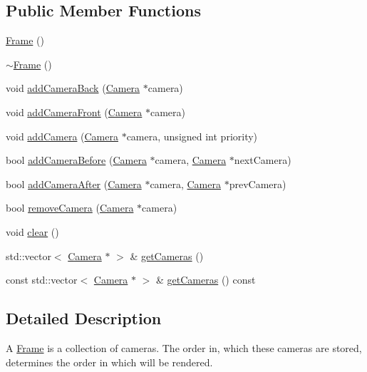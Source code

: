 \subsection*{Public Member Functions}
\begin{DoxyCompactItemize}
\item 
\mbox{\hyperlink{classec_1_1_frame_a80ed1da85818f646b6b80fb6c8a6c2a6}{Frame}} ()
\item 
\mbox{\hyperlink{classec_1_1_frame_af2b2c733cacb47d99e460a2b75667eaa}{$\sim$\+Frame}} ()
\item 
void \mbox{\hyperlink{classec_1_1_frame_a1cfcb26e088e6f6b07103af8ac9d3bfa}{add\+Camera\+Back}} (\mbox{\hyperlink{classec_1_1_camera}{Camera}} $\ast$camera)
\item 
void \mbox{\hyperlink{classec_1_1_frame_abcbaa8a587c8ad75173aacaa853bc5b2}{add\+Camera\+Front}} (\mbox{\hyperlink{classec_1_1_camera}{Camera}} $\ast$camera)
\item 
void \mbox{\hyperlink{classec_1_1_frame_a04ba39407bc0f6e78fe47f37b3f19131}{add\+Camera}} (\mbox{\hyperlink{classec_1_1_camera}{Camera}} $\ast$camera, unsigned int priority)
\item 
bool \mbox{\hyperlink{classec_1_1_frame_af1f1769a61f70a756fd762d80a676063}{add\+Camera\+Before}} (\mbox{\hyperlink{classec_1_1_camera}{Camera}} $\ast$camera, \mbox{\hyperlink{classec_1_1_camera}{Camera}} $\ast$next\+Camera)
\item 
bool \mbox{\hyperlink{classec_1_1_frame_a60b34025921413dd3ea92c9146d76825}{add\+Camera\+After}} (\mbox{\hyperlink{classec_1_1_camera}{Camera}} $\ast$camera, \mbox{\hyperlink{classec_1_1_camera}{Camera}} $\ast$prev\+Camera)
\item 
bool \mbox{\hyperlink{classec_1_1_frame_a7a93ec89a809f5b7e685c5adc73d6cda}{remove\+Camera}} (\mbox{\hyperlink{classec_1_1_camera}{Camera}} $\ast$camera)
\item 
void \mbox{\hyperlink{classec_1_1_frame_ae9896c9acff0f468a750d9eae784b23b}{clear}} ()
\item 
std\+::vector$<$ \mbox{\hyperlink{classec_1_1_camera}{Camera}} $\ast$ $>$ \& \mbox{\hyperlink{classec_1_1_frame_a942b4c8826f6169703ff6b19ae60be8c}{get\+Cameras}} ()
\item 
const std\+::vector$<$ \mbox{\hyperlink{classec_1_1_camera}{Camera}} $\ast$ $>$ \& \mbox{\hyperlink{classec_1_1_frame_a80aefbcba8339fabc3b4aa2b8b21a8bf}{get\+Cameras}} () const
\end{DoxyCompactItemize}


\subsection{Detailed Description}
A \mbox{\hyperlink{classec_1_1_frame}{Frame}} is a collection of cameras. The order in, which these cameras are stored, determines the order in which will be rendered. 

